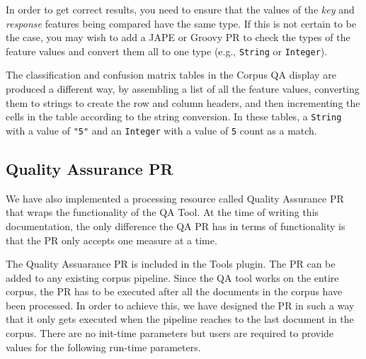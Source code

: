 In order to get correct results, you need to ensure that the values of the
\emph{key} and \emph{response} features being compared have the same type.  If
this is not certain to be the case, you may wish to add a JAPE or Groovy PR to
check the types of the feature values and convert them all to one type (e.g.,
\texttt{String} or \texttt{Integer}).

The classification and confusion matrix tables in the Corpus QA display are
produced a different way, by assembling a list of all the feature values,
converting them to strings to create the row and column headers, and then
incrementing the cells in the table according to the string conversion.  In
these tables, a \texttt{String} with a value of \texttt{"5"} and an
\texttt{Integer} with a value of \texttt{5} count as a match.
\subsection[sec:eval:qapr]{Quality Assurance PR}

We have also implemented a processing resource called Quality Assurance PR that
wraps the functionality of the QA Tool.  At the time of writing this 
documentation, the only difference the QA PR has in terms of functionality is 
that the PR only accepts one measure at a time.

The Quality Assuarance PR is included in the Tools plugin.  The PR can be added 
to any existing corpus pipeline.  Since the QA tool works on the entire corpus, 
the PR has to be executed after all the documents in the corpus have been 
processed.  In order to achieve this, we have designed the PR in such a way that
it only gets executed when the pipeline reaches to the last document in the 
corpus.  There are no init-time parameters but users are required to provide 
values for the following run-time parameters.

